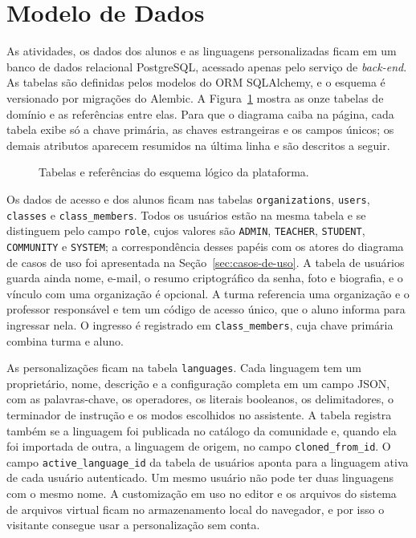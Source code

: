 \section{Modelo de Dados}
\label{sec:modelo-dados}

As atividades, os dados dos alunos e as linguagens personalizadas ficam em um banco de dados relacional PostgreSQL, acessado apenas pelo serviço de \textit{back-end}. As tabelas são definidas pelos modelos do ORM SQLAlchemy, e o esquema é versionado por migrações do Alembic. A Figura~\ref{fig:esquema-banco} mostra as onze tabelas de domínio e as referências entre elas. Para que o diagrama caiba na página, cada tabela exibe só a chave primária, as chaves estrangeiras e os campos únicos; os demais atributos aparecem resumidos na última linha e são descritos a seguir.

\begin{figure}[htbp]
    \centering
    \caption{Tabelas e referências do esquema lógico da plataforma.}
    \label{fig:esquema-banco}
    
\end{figure}
\FloatBarrier

Os dados de acesso e dos alunos ficam nas tabelas \texttt{organizations}, \texttt{users}, \texttt{classes} e \texttt{class\_members}. Todos os usuários estão na mesma tabela e se distinguem pelo campo \texttt{role}, cujos valores são \texttt{ADMIN}, \texttt{TEACHER}, \texttt{STUDENT}, \texttt{COMMUNITY} e \texttt{SYSTEM}; a correspondência desses papéis com os atores do diagrama de casos de uso foi apresentada na Seção~\ref{sec:casos-de-uso}. A tabela de usuários guarda ainda nome, e-mail, o resumo criptográfico da senha, foto e biografia, e o vínculo com uma organização é opcional. A turma referencia uma organização e o professor responsável e tem um código de acesso único, que o aluno informa para ingressar nela. O ingresso é registrado em \texttt{class\_members}, cuja chave primária combina turma e aluno.

As personalizações ficam na tabela \texttt{languages}. Cada linguagem tem um proprietário, nome, descrição e a configuração completa em um campo JSON, com as palavras-chave, os operadores, os literais booleanos, os delimitadores, o terminador de instrução e os modos escolhidos no assistente. A tabela registra também se a linguagem foi publicada no catálogo da comunidade e, quando ela foi importada de outra, a linguagem de origem, no campo \texttt{cloned\_from\_id}. O campo \texttt{active\_language\_id} da tabela de usuários aponta para a linguagem ativa de cada usuário autenticado. Um mesmo usuário não pode ter duas linguagens com o mesmo nome. A customização em uso no editor e os arquivos do sistema de arquivos virtual ficam no armazenamento local do navegador, e por isso o visitante consegue usar a personalização sem conta.

